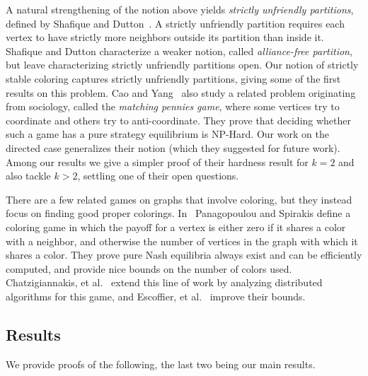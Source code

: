 \documentclass{llncs}
\begin{document}
A natural strengthening of the notion above yields \emph{strictly unfriendly
partitions},  defined by Shafique and Dutton~\cite{ShafiqueD09}.  A strictly
unfriendly partition requires each vertex to have strictly more neighbors
outside its partition than inside it.  Shafique and Dutton characterize a weaker
notion, called \emph{alliance-free partition}, but leave characterizing strictly
unfriendly partitions open.  Our notion of strictly stable coloring captures
strictly unfriendly partitions, giving some of the first results on this
problem.  Cao and Yang~\cite{CaoY12a} also study a related problem originating
from sociology, called the \emph{matching pennies game}, where some vertices try
to coordinate and others try to anti-coordinate.  They prove that deciding
whether such a game has a pure strategy equilibrium is NP-Hard.  Our work on the
directed case generalizes their notion (which they suggested for future work).
Among our results we give a simpler proof of their hardness result for $k=2$ and
also tackle  $k >2$, settling one of their open questions.

There are a few related games on graphs that involve coloring, but they instead
focus on finding good proper colorings. In~\cite{PS08} Panagopoulou and Spirakis
define a coloring game in which the payoff for a vertex is either zero if it
shares a color with a neighbor, and otherwise the number of vertices in the
graph with which it shares a color. They prove pure Nash equilibria always exist
and can be efficiently computed, and provide nice bounds on the number of colors
used. Chatzigiannakis, et al.~\cite{CKPS10} extend this line of work by
analyzing distributed algorithms for this game, and Escoffier, et
al.~\cite{EGM12} improve their bounds. 


\subsection{Results}

We provide proofs of the following, the last two being our main results.
\end{document}
